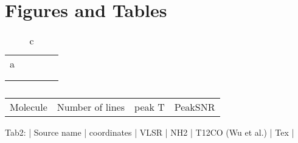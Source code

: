 \section{Figures and Tables}


\begin{table} 
    \begin{tabular}{ c c c c c }
        a &  &  &  &  \\ 
         &  &  &  &  \\ 
         &  &  &  &  \\ 
    \end{tabular} 
    \caption{c} 
\end{table}



\begin{table}
\caption{}
\begin{tabular}{|c|c|c|c|}
Molecule & Number of lines & peak T & PeakSNR\\
\end{tabular}
\end{table}

 Tab2: | Source name | coordinates | VLSR | NH2 | T12CO (Wu et al.) | Tex | 

 
  
  
  
  
  
  
  
  
  
  
  
  
  